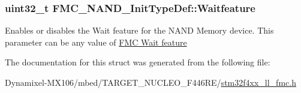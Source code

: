 \subsubsection[{\texorpdfstring{Waitfeature}{Waitfeature}}]{\setlength{\rightskip}{0pt plus 5cm}uint32\+\_\+t F\+M\+C\+\_\+\+N\+A\+N\+D\+\_\+\+Init\+Type\+Def\+::\+Waitfeature}\hypertarget{struct_f_m_c___n_a_n_d___init_type_def_af32f615ad4a0715b2eb29376480f06e6}{}\label{struct_f_m_c___n_a_n_d___init_type_def_af32f615ad4a0715b2eb29376480f06e6}
Enables or disables the Wait feature for the N\+A\+ND Memory device. This parameter can be any value of \hyperlink{group___f_m_c___wait__feature}{F\+MC Wait feature} 

The documentation for this struct was generated from the following file\+:\begin{DoxyCompactItemize}
\item 
Dynamixel-\/\+M\+X106/mbed/\+T\+A\+R\+G\+E\+T\+\_\+\+N\+U\+C\+L\+E\+O\+\_\+\+F446\+R\+E/\hyperlink{stm32f4xx__ll__fmc_8h}{stm32f4xx\+\_\+ll\+\_\+fmc.\+h}\end{DoxyCompactItemize}
